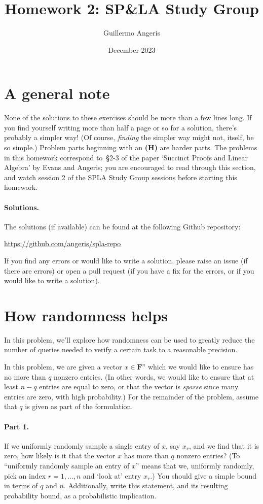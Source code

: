 \documentclass[12pt]{article}
\title{Homework 2: SP\&LA Study Group}
\author{Guillermo Angeris}
\date{December 2023}
\newcommand{\field}{\mathbf{F}}
\begin{document}
 
\maketitle 

\section*{A general note}
None of the solutions to these exercises should be more than a few lines long.
If you find yourself writing more than half a page or so for a solution,
there's probably a simpler way! (Of course, \emph{finding} the simpler way
might not, itself, be so simple.) Problem parts beginning with an {\bf (H)} are
harder parts. The problems in this homework correspond to~\S2-3 of the paper
`Succinct Proofs and Linear Algebra' by Evans and Angeris; you are encouraged
to read through this section, and watch session 2 of the SPLA Study Group
sessions before starting this homework.

\paragraph{Solutions.} The solutions (if available) can be found at the
following Github repository:
\begin{center}
    \url{https://github.com/angeris/spla-repo}
\end{center}
If you find any errors or would like to write a solution, please raise an issue
(if there are errors) or open a pull request (if you have a fix for the errors,
or if you would like to write a solution).

\section{How randomness helps}
In this problem, we'll explore how randomness can be used to greatly reduce
the number of queries needed to verify a certain task to a reasonable
precision.

In this problem, we are given a vector $x \in \field^n$ which we would like to
ensure has no more than $q$ nonzero entries. (In other words, we would like to
ensure that at least $n-q$ entries are equal to zero, or that the vector is
\emph{sparse} since many entries are zero, with high probability.) For the
remainder of the problem, assume that $q$ is given as part of the formulation.

\paragraph{Part 1.} If we uniformly randomly sample a single entry of $x$, say
$x_r$, and we find that it is zero, how likely is it that the vector $x$ has
more than $q$ nonzero entries? (To ``uniformly randomly sample an entry of
$x$'' means that we, uniformly randomly, pick an index $r=1, \dots, n$ and
`look at' entry $x_r$.) You should give a simple bound in terms of $q$ and $n$.
Additionally, write this statement, and its resulting probability bound, as a
probabilistic implication.
\end{document}
